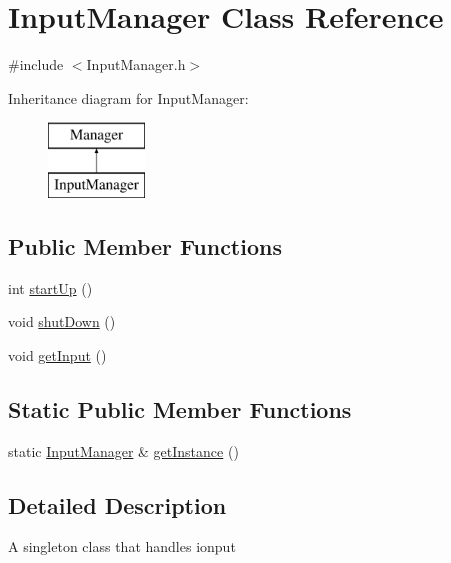 \hypertarget{class_input_manager}{\section{Input\+Manager Class Reference}
\label{class_input_manager}
}


{\ttfamily \#include $<$Input\+Manager.\+h$>$}

Inheritance diagram for Input\+Manager\+:\begin{figure}[H]
\begin{center}
\leavevmode
\includegraphics[height=2.000000cm]{class_input_manager}
\end{center}
\end{figure}
\subsection*{Public Member Functions}
\begin{DoxyCompactItemize}
\item 
int \hyperlink{class_input_manager_a210997e45748bae7d0901ac3ede788c6}{start\+Up} ()
\item 
void \hyperlink{class_input_manager_ad9ae425dbb849fda4616484e7156600e}{shut\+Down} ()
\item 
void \hyperlink{class_input_manager_a3701626b38fab73b47561fa961a2739e}{get\+Input} ()
\end{DoxyCompactItemize}
\subsection*{Static Public Member Functions}
\begin{DoxyCompactItemize}
\item 
static \hyperlink{class_input_manager}{Input\+Manager} \& \hyperlink{class_input_manager_a4e1058b89c07e2f3ec1097b843c19fc8}{get\+Instance} ()
\end{DoxyCompactItemize}


\subsection{Detailed Description}
A singleton class that handles ionput 


